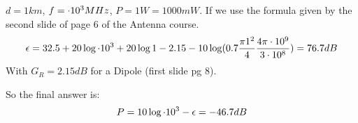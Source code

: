 \begin{solution}
	$d = 1km$, $f = \cdot 10^{3} MHz$, $P = 1W = 1000 mW$.
	If we use the formula given by the second slide of page 6 of the Antenna course.
	$$\epsilon = 32.5 + 20 \log \cdot 10^{3} + 20 \log 1 - 2.15 - 10\log (0.7\frac{\pi 1^2}{4}\frac{4\pi \cdot 10^{9}}{3 \cdot 10^{8}}) = 76.7dB$$
	With $G_R = 2.15 dB$ for a Dipole (first slide pg 8).  
	
	So the final answer is:
	$$P = 10 \log \cdot 10^{3} - \epsilon = -46.7dB$$
\end{solution}

\begin{solution}
	

\end{solution}


\nosolution
\nosolution
\nosolution